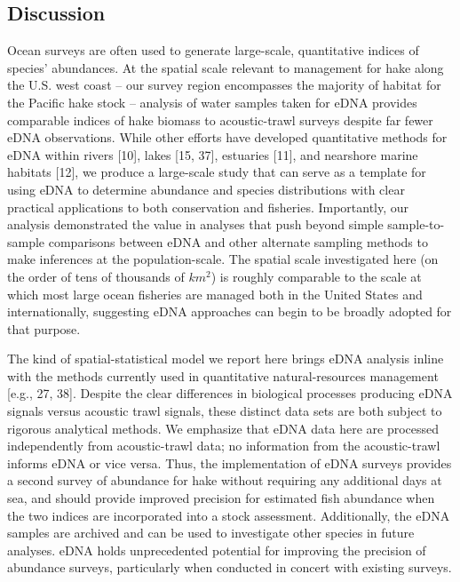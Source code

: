 \documentclass[
]{article}
\begin{document}
\hypertarget{discussion}{%
\subsection{Discussion}\label{discussion}}

Ocean surveys are often used to generate large-scale, quantitative
indices of species' abundances. At the spatial scale relevant to
management for hake along the U.S. west coast -- our survey region
encompasses the majority of habitat for the Pacific hake stock --
analysis of water samples taken for eDNA provides
comparable indices of hake biomass to acoustic-trawl surveys despite far
fewer eDNA observations. While other efforts have developed quantitative
methods for eDNA within rivers {[}10{]}, lakes {[}15, 37{]}, estuaries {[}11{]}, and
nearshore marine habitats {[}12{]}, we produce a large-scale study
that can serve as a template for using eDNA to determine abundance and species
distributions with clear practical applications to both conservation and
fisheries. Importantly, our analysis demonstrated the value in analyses that 
push beyond simple sample-to-sample comparisons between eDNA and other
alternate sampling methods to make inferences at the population-scale.
The spatial scale investigated here (on the order of tens of thousands of \(km^2\))
is roughly comparable to the scale at which most large ocean
fisheries are managed both in the United States and internationally,
suggesting eDNA approaches can begin to be broadly adopted for that
purpose.

The kind of spatial-statistical model we report here brings eDNA analysis 
inline with the methods currently used in quantitative natural-resources management
{[}e.g., 27, 38{]}. Despite the clear differences in biological processes
producing eDNA signals versus acoustic trawl signals, these
distinct data sets are both subject to rigorous analytical methods. We
emphasize that eDNA data here are processed independently from
acoustic-trawl data; no information from the acoustic-trawl informs eDNA or
vice versa. Thus, the implementation of eDNA surveys provides a second
survey of abundance for hake without requiring any additional days at
sea, and should provide improved precision for estimated 
fish abundance when the two indices are
incorporated into a stock assessment. Additionally, the eDNA samples are archived and can be used  
to investigate other species in future analyses. eDNA holds
unprecedented potential for improving the precision of abundance
surveys, particularly when conducted in concert with existing surveys.
\end{document}
